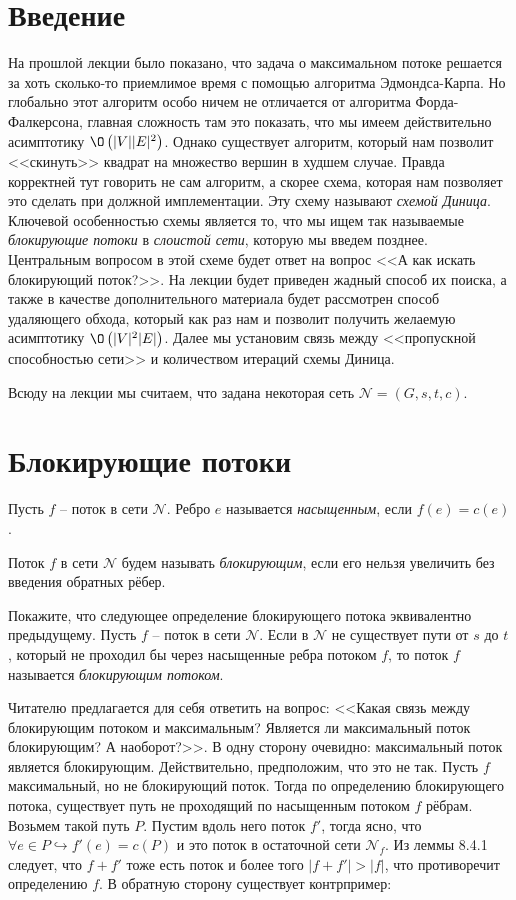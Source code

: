 \section{Введение}

На прошлой лекции было показано, что задача о максимальном потоке решается за хоть сколько-то приемлимое время с помощью алгоритма Эдмондса-Карпа. 
Но глобально этот алгоритм особо ничем не отличается от алгоритма Форда-Фалкерсона, главная сложность там это показать, что мы имеем действительно асимптотику $\O\left(|V||E|^2\right)$.
Однако существует алгоритм, который нам позволит <<скинуть>> квадрат на множество вершин в худшем случае. Правда корректней тут говорить не сам алгоритм, а скорее схема, которая нам позволяет это сделать при должной имплементации. 
Эту схему называют \textit{схемой Диница}. Ключевой особенностью схемы является то, что мы ищем так называемые \textit{блокирующие потоки} в \textit{слоистой сети}, которую мы введем позднее. Центральным вопросом в этой схеме будет ответ на вопрос <<А как искать блокирующий поток?>>. 
На лекции будет приведен жадный способ их поиска, а также в качестве дополнительного материала будет рассмотрен способ удаляющего обхода, который как раз нам и позволит получить желаемую асимптотику $\O\left(|V|^2|E|\right)$.
Далее мы установим связь между <<пропускной способностью сети>> и количеством итераций схемы Диница.

Всюду на лекции мы считаем, что задана некоторая сеть $\mathcal{N} = (G, s, t, c)$.

\section{Блокирующие потоки}

\Def Пусть $f$ -- поток в сети $\mathcal{N}$. Ребро $e$ называется \textit{насыщенным}, если $f(e) = c(e)$.

\Def Поток $f$ в сети $\mathcal{N}$ будем называть \textit{блокирующим}, если его нельзя увеличить без введения обратных рёбер.

\Exe Покажите, что следующее определение блокирующего потока эквивалентно предыдущему. Пусть $f$ -- поток в сети $\mathcal{N}$. 
Если в $\mathcal{N}$ не существует пути от $s$ до $t$, который не проходил бы через насыщенные ребра потоком $f$, то поток $f$ называется \textit{блокирующим потоком}.

Читателю предлагается для себя ответить на вопрос: <<Какая связь между блокирующим потоком и максимальным? Является ли максимальный поток блокирующим? А наоборот?>>. В одну сторону очевидно: максимальный поток является блокирующим. Действительно, предположим, что это не так. 
Пусть $f$ максимальный, но не блокирующий поток. Тогда по определению блокирующего потока, существует путь не проходящий по насыщенным потоком $f$ рёбрам.
Возьмем такой путь $P$. Пустим вдоль него поток $f'$, тогда ясно, что $\forall e \in P \hookrightarrow f'(e) = c(P)$ и это поток в остаточной сети $\mathcal{N}_f$. 
Из леммы 8.4.1 следует, что $f + f'$ тоже есть поток и более того $|f + f'| > |f|$, что противоречит определению $f$. В обратную сторону существует контрпример:


